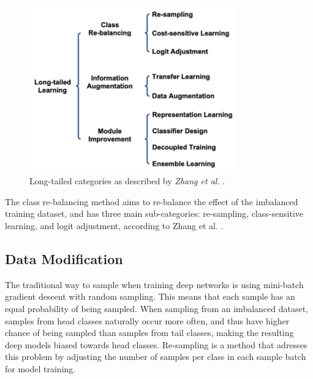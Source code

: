 \begin{figure}[ht]
    \centering
    \includegraphics[width=0.8\textwidth]{Images/lt_methods_categories.png} 
    \caption{Long-tailed categories as described by \textit{Zhang et al.} \cite{zhang2023deep}.}
    \label{fig:lt_main_categories} 
\end{figure}

The class re-balancing method aims to re-balance the effect of the imbalanced training dataset, and has three main sub-categories: re-sampling, class-sensitive learning, and logit adjustment, according to Zhang et al. \cite{zhang2023deep}. 


\subsection{Data Modification}
The traditional way to sample when training deep networks is using mini-batch gradient descent with random sampling. This means that each sample has an equal probability of being sampled. When sampling from an imbalanced dataset, samples from head classes naturally occur more often, and thus have higher chance of being sampled than samples from tail classes, making the resulting deep models biased towards head classes. Re-sampling is a method that adresses this problem by adjusting the number of samples per class in each sample batch for model training. 

